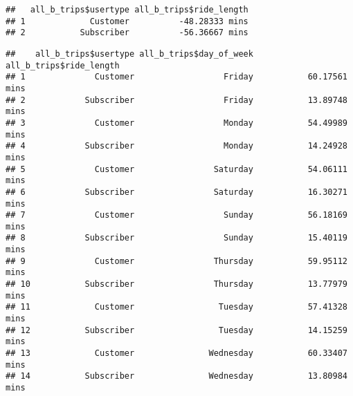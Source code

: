 \documentclass[
]{article}
\newenvironment{Shaded}{\begin{snugshade}}{\end{snugshade}}
\newcommand{\AttributeTok}[1]{\textcolor[rgb]{0.77,0.63,0.00}{#1}}
\newcommand{\CommentTok}[1]{\textcolor[rgb]{0.56,0.35,0.01}{\textit{#1}}}
\newcommand{\FunctionTok}[1]{\textcolor[rgb]{0.00,0.00,0.00}{#1}}
\newcommand{\NormalTok}[1]{#1}
\newcommand{\SpecialCharTok}[1]{\textcolor[rgb]{0.00,0.00,0.00}{#1}}
\begin{document}
\begin{verbatim}
##   all_b_trips$usertype all_b_trips$ride_length
## 1             Customer          -48.28333 mins
## 2           Subscriber          -56.36667 mins
\end{verbatim}

\begin{Shaded}
\end{Shaded}

\begin{verbatim}
##    all_b_trips$usertype all_b_trips$day_of_week all_b_trips$ride_length
## 1              Customer                  Friday           60.17561 mins
## 2            Subscriber                  Friday           13.89748 mins
## 3              Customer                  Monday           54.49989 mins
## 4            Subscriber                  Monday           14.24928 mins
## 5              Customer                Saturday           54.06111 mins
## 6            Subscriber                Saturday           16.30271 mins
## 7              Customer                  Sunday           56.18169 mins
## 8            Subscriber                  Sunday           15.40119 mins
## 9              Customer                Thursday           59.95112 mins
## 10           Subscriber                Thursday           13.77979 mins
## 11             Customer                 Tuesday           57.41328 mins
## 12           Subscriber                 Tuesday           14.15259 mins
## 13             Customer               Wednesday           60.33407 mins
## 14           Subscriber               Wednesday           13.80984 mins
\end{verbatim}
\end{document}
